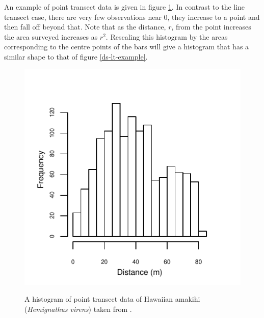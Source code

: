 An example of point transect data is given in figure \ref{ds-pt-example}. In contrast to the line transect case, there are very few observations near 0, they increase to a point and then fall off beyond that. Note that as the distance, $r$, from the point increases the area surveyed increases as $r^2$. Rescaling this histogram by the areas corresponding to the centre points of the bars will give a histogram that has a similar shape to that of figure \ref{ds-lt-example}.

\begin{figure}
\centering
\includegraphics{intro/figs/pt-data-example.pdf}\\
\caption{A histogram of point transect data of Hawaiian amakihi (\textit{Hemignathus virens}) taken from .}
\label{ds-pt-example}
\end{figure}


